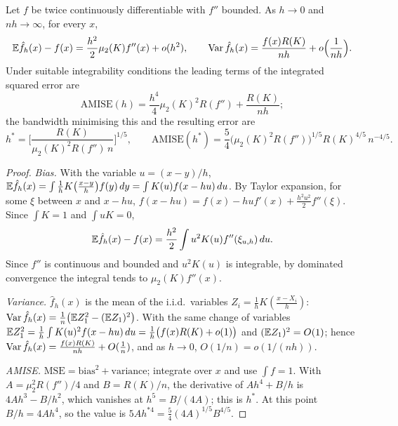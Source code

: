 \documentclass[main.tex]{subfiles}
\begin{document}
\begin{theorem}\label{thm:kde}
Let $f$ be twice continuously differentiable with $f''$ bounded. As $h\to0$ and $nh\to\infty$, for every $x$,
\[
\mathbb{E}\hat f_h(x)-f(x)=\frac{h^2}2\mu_2(K)f''(x)+o(h^2),\qquad\operatorname{Var}\hat f_h(x)=\frac{f(x)R(K)}{nh}+o\Big(\frac1{nh}\Big).
\]
Under suitable integrability conditions the leading terms of the integrated squared error are
\[
\mathrm{AMISE}(h)=\frac{h^4}4\mu_2(K)^2R(f'')+\frac{R(K)}{nh} ;
\]
the bandwidth minimising this and the resulting error are
\[
h^*=\Big[\frac{R(K)}{\mu_2(K)^2R(f'')\,n}\Big]^{1/5},\qquad\mathrm{AMISE}(h^*)=\frac54\big(\mu_2(K)^2R(f'')\big)^{1/5}R(K)^{4/5}\,n^{-4/5}.
\]
\end{theorem}
\begin{proof}
\emph{Bias.} With the variable $u=(x-y)/h$, $\mathbb{E}\hat f_h(x)=\int\frac1hK\big(\frac{x-y}h\big)f(y)\,dy=\int K(u)f(x-hu)\,du$. By Taylor expansion, for some $\xi$ between $x$ and $x-hu$, $f(x-hu)=f(x)-huf'(x)+\frac{h^2u^2}2f''(\xi)$. Since $\int K=1$ and $\int uK=0$,
\[
\mathbb{E}\hat f_h(x)-f(x)=\frac{h^2}2\int u^2K(u)f''(\xi_{u,h})\,du .
\]
Since $f''$ is continuous and bounded and $u^2K(u)$ is integrable, by dominated convergence the integral tends to $\mu_2(K)f''(x)$.

\emph{Variance.} $\hat f_h(x)$ is the mean of the i.i.d.\ variables $Z_i=\frac1hK(\frac{x-X_i}h)$: $\operatorname{Var}\hat f_h(x)=\frac1n\big(\mathbb{E} Z_1^2-(\mathbb{E} Z_1)^2\big)$. With the same change of variables $\mathbb{E} Z_1^2=\frac1h\int K(u)^2f(x-hu)\,du=\frac1h\big(f(x)R(K)+o(1)\big)$ and $(\mathbb{E} Z_1)^2=O(1)$; hence $\operatorname{Var}\hat f_h(x)=\frac{f(x)R(K)}{nh}+O(\frac1n)$, and as $h\to0$, $O(1/n)=o(1/(nh))$.

\emph{AMISE.} $\mathrm{MSE}=\text{bias}^2+\text{variance}$; integrate over $x$ and use $\int f=1$. With $A=\mu_2^2R(f'')/4$ and $B=R(K)/n$, the derivative of $Ah^4+B/h$ is $4Ah^3-B/h^2$, which vanishes at $h^5=B/(4A)$; this is $h^*$. At this point $B/h=4Ah^4$, so the value is $5Ah^{*4}=\frac54(4A)^{1/5}B^{4/5}$.
\end{proof}
\end{document}
